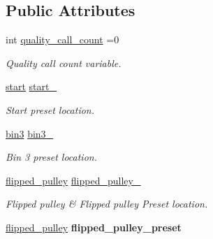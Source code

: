 \subsection*{Public Attributes}
\begin{DoxyCompactItemize}
\item 
\mbox{\label{classGantryControl_a34ef8dd7ccc4b5bca673caca267b8cae}} 
int \hyperlink{classGantryControl_a34ef8dd7ccc4b5bca673caca267b8cae}{quality\+\_\+call\+\_\+count} =0
\begin{DoxyCompactList}\small\item\em Quality call count variable. \end{DoxyCompactList}\item 
\mbox{\label{classGantryControl_a5a45b3fc19e50496208af90d8c49590d}} 
\hyperlink{utils_8h_a36494ad089a17d7ae00c4cc799ed0970}{start} \hyperlink{classGantryControl_a5a45b3fc19e50496208af90d8c49590d}{start\+\_\+}
\begin{DoxyCompactList}\small\item\em Start preset location. \end{DoxyCompactList}\item 
\mbox{\label{classGantryControl_a50911044f2a712e70d35ad0513a1d3cf}} 
\hyperlink{structPresetLocation}{bin3} \hyperlink{classGantryControl_a50911044f2a712e70d35ad0513a1d3cf}{bin3\+\_\+}
\begin{DoxyCompactList}\small\item\em Bin 3 preset location. \end{DoxyCompactList}\item 
\mbox{\label{classGantryControl_aafaf6e121f9340813966dc81aaf0853f}} 
\hyperlink{structPresetLocation}{flipped\+\_\+pulley} \hyperlink{classGantryControl_aafaf6e121f9340813966dc81aaf0853f}{flipped\+\_\+pulley\+\_\+}
\begin{DoxyCompactList}\small\item\em Flipped pulley \& Flipped pulley Preset location. \end{DoxyCompactList}\item 
\mbox{\label{classGantryControl_addcefc6d7411cbb92b007eb21afc6cd1}} 
\hyperlink{structPresetLocation}{flipped\+\_\+pulley} {\bfseries flipped\+\_\+pulley\+\_\+preset}

\end{DoxyCompactItemize}
